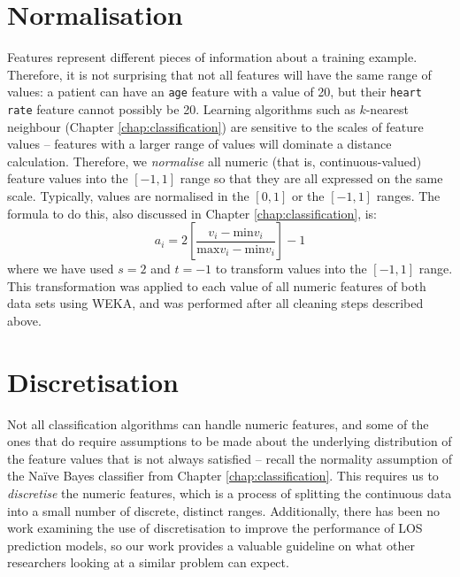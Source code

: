\section{Normalisation}
Features represent different pieces of information about a training example.
Therefore, it is not surprising that not all features will have the same range
of values: a patient can have an \texttt{age} feature with a value of 20, but
their \texttt{heart rate} feature cannot possibly be 20. Learning algorithms
such as $k$-nearest neighbour (Chapter \ref{chap:classification})
are sensitive to the scales of feature values -- features with a larger range
of values will dominate a distance calculation. Therefore, we
\textit{normalise} all numeric (that is, continuous-valued)
feature values into the $[-1,1]$ range so that they are all expressed on the
same scale. Typically, values are normalised in the $[0,1]$ or the $[-1,1]$
ranges.
The formula to do this, also discussed in Chapter \ref{chap:classification},
is:
\begin{equation*}
a_i = 2\left[\dfrac{v_i - \mathrm{min }v_i}{\mathrm{max }v_i - \mathrm{min }v_i}\right] - 1
\end{equation*}
where we have used $s=2$ and $t=-1$ to transform values into the $[-1,1]$
range. This transformation was applied to each value of all numeric features
of both data sets
using WEKA, and was performed after all cleaning steps described above.

\section{Discretisation}
Not all classification algorithms can handle numeric features, and some of the
ones that do require assumptions to be made about the underlying distribution
of the feature values that is not always satisfied -- recall the normality
assumption of the Na\"{i}ve Bayes classifier
from Chapter \ref{chap:classification}. This requires us
to \textit{discretise} the numeric features, which is a process of splitting
the continuous data into a small number of discrete, distinct ranges.
Additionally, there has been no work examining the use of discretisation to
improve the performance of LOS prediction models, so our work provides a
valuable guideline on what other researchers looking at a similar problem can
expect.

